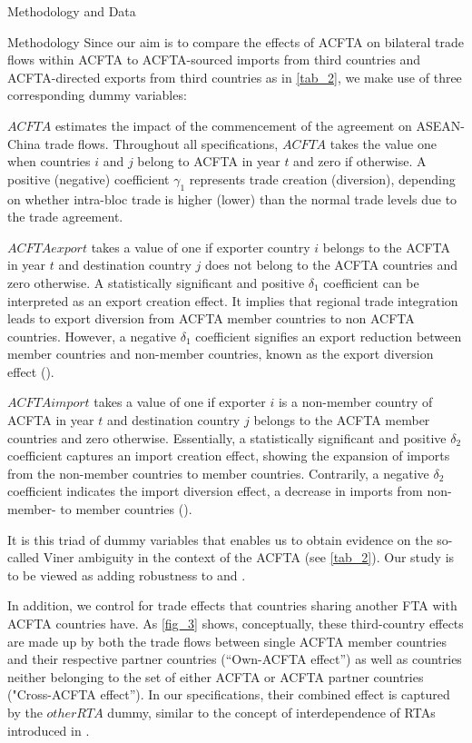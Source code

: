 \begin{section}{Methodology and Data }
\begin{subsection}{Methodology }
Since our aim is to compare the effects of ACFTA on bilateral trade flows within ACFTA to ACFTA-sourced imports from third countries and ACFTA-directed exports from third countries as in \autoref{tab_2}, we make use of three corresponding dummy variables:

$ACFTA$ estimates the impact of the commencement of the agreement on ASEAN-China trade flows. Throughout all specifications, $ACFTA$ takes the value one when countries $i$ and $j$ belong to ACFTA in year $t$ and zero if otherwise. A positive (negative) coefficient $\gamma_1$ represents trade creation (diversion), depending on whether intra-bloc trade is higher (lower) than the normal trade levels due to the trade agreement. 

$ACFTAexport$ takes a value of one if exporter country $i$ belongs to the ACFTA in year $t$ and destination country $j$ does not belong to the ACFTA countries and zero otherwise. A statistically significant and positive $\delta_1$ coefficient can be interpreted as an export creation effect. It implies that regional trade integration leads to export diversion from ACFTA member countries to non ACFTA countries. However, a negative $\delta_1$ coefficient signifies an export reduction between member countries and non-member countries, known as the export diversion effect (\cite{carrere_2006}). 

$ACFTAimport$ takes a value of one if exporter $i$ is a non-member country of ACFTA in year $t$ and destination country $j$ belongs to the ACFTA member countries and zero otherwise. Essentially, a statistically significant and positive $\delta_2$ coefficient captures an import creation effect, showing the expansion of imports from the non-member countries to member countries. Contrarily, a negative $\delta_2$ coefficient indicates the import diversion effect, a decrease in imports from non-member- to member countries (\cite{carrere_2006}).

It is this triad of dummy variables that enables us to obtain evidence on the so-called Viner ambiguity in the context of the ACFTA (see \autoref{tab_2}). Our study is to be viewed as adding robustness to \cite{smz2014} and \cite{wla_2021}.

In addition, we control for trade effects that countries sharing another FTA with ACFTA countries have. As \autoref{fig_3} shows, conceptually, these third-country effects are made up by both the trade flows between single ACFTA member countries and their respective partner countries (“Own-ACFTA effect”) as well as countries neither belonging to the set of either ACFTA or ACFTA partner countries ("Cross-ACFTA effect”). In our specifications, their combined effect is captured by the $otherRTA$ dummy, similar to the concept of interdependence of RTAs introduced in \cite{bbm2014}.



\end{subsection}
\end{section}
